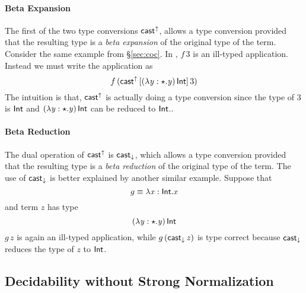 \paragraph{Beta Expansion} The first of the two type conversions
$ \mathsf{cast}^{\uparrow} $, allows a type conversion provided that the resulting
type is a \emph{beta expansion} of the original type of the term.
Consider the same example
from \S\ref{sec:coc}. In \name, $f\,3$ is an ill-typed
application. Instead we must write the application as \[
f\,(\mathsf{cast}^{\uparrow} \, [  (  \lambda  \mathit{y}  :  \star  .  \mathit{y}  ) \, \mathsf{Int}  ] \,  3) \] The intuition is that,
$ \mathsf{cast}^{\uparrow} $ is actually doing a type conversion since the type of $ 3 $
is $  \mathsf{Int}  $ and $ (  \lambda  \mathit{y}  :  \star  .  \mathit{y}  ) \, \mathsf{Int} $ can be reduced to $  \mathsf{Int} 
$.. 

\paragraph{Beta Reduction}
The dual operation of $ \mathsf{cast}^{\uparrow} $ is $ \mathsf{cast}_{\downarrow} $, which allows a
type conversion provided that the resulting type is a \emph{beta
  reduction} of the original type of the term. The use of
$ \mathsf{cast}_{\downarrow} $ is better explained by another similar example. Suppose
that \[ g \equiv \lambda  \mathit{x}  :  \mathsf{Int}  .  \mathit{x} \] and term $z$ has type \[
(  \lambda  \mathit{y}  :  \star  .  \mathit{y}  ) \, \mathsf{Int} \] $ g\,z $ is again an ill-typed application,
while $ g\,(\mathsf{cast}_{\downarrow} \, \mathit{z}) $ is type correct because $ \mathsf{cast}_{\downarrow} $
reduces the type of $ z $ to $  \mathsf{Int}  $. 

\subsection{Decidability without Strong Normalization}

